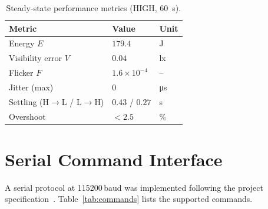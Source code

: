 \documentclass[10pt,twocolumn]{article}
\begin{document}
\begin{table}[H]
\centering
\caption{Steady-state performance metrics (HIGH, \SI{60}{\second}).}
\label{tab:metrics}
\small
\begin{tabular}{@{}lll@{}}
  \toprule
  Metric & Value & Unit \\
  \midrule
  Energy $E$              & $179.4$              & \si{\joule} \\
  Visibility error $V$    & $0.04$               & \si{\lux} \\
  Flicker $F$             & $1.6 \times 10^{-4}$ & -- \\
  Jitter (max)            & $0$                  & \si{\micro\second} \\
  Settling (H$\to$L / L$\to$H) & $0.43$ / $0.27$ & \si{\second} \\
  Overshoot               & $< 2.5$              & \% \\
  \bottomrule
\end{tabular}
\end{table}

\section{Serial Command Interface}

A serial protocol at 115200\,baud was implemented following the project specification~\cite{projectguide}. Table~\ref{tab:commands} lists the supported commands.
\end{document}
